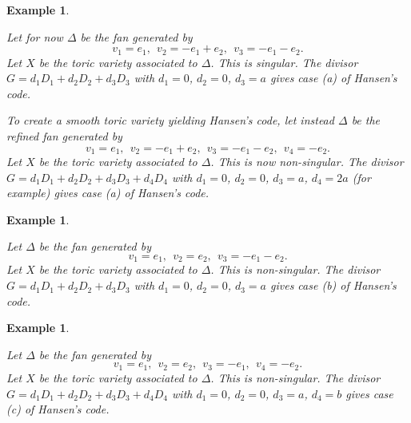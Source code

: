\documentclass[12pt]{article}
\newtheorem{example}[theorem]{Example}
\begin{document}
\begin{example}
\label{example:fan5}

Let for now $\Delta$ be the fan generated by 
\[
v_1=e_1,\ \ v_2=-e_1+e_2,\ \ v_3=-e_1-e_2.
\]
Let $X$ be the toric variety associated to $\Delta$.
This is singular.
The divisor $G=d_1D_1+d_2D_2+d_3D_3$ with
$d_1=0$, $d_2=0$, $d_3=a$ gives case (a) of
Hansen's code.

To create a smooth toric variety yielding Hansen's code,
let instead $\Delta$ be the refined fan generated by 
\[
v_1=e_1,\ \ v_2=-e_1+e_2,\ \ v_3=-e_1-e_2,\ \ v_4=-e_2.
\]
Let $X$ be the toric variety associated to $\Delta$.
This is now non-singular.
The divisor $G=d_1D_1+d_2D_2+d_3D_3+d_4D_4$ with
$d_1=0$, $d_2=0$, $d_3=a$, $d_4=2a$ (for example)
gives case (a) of Hansen's code.
\end{example}


\begin{example}
\label{example:fan4}

Let $\Delta$ be the fan generated by 
\[
v_1=e_1,\ \ v_2=e_2,\ \ v_3=-e_1-e_2.
\]
Let $X$ be the toric variety associated to $\Delta$.
This is non-singular.
The divisor $G=d_1D_1+d_2D_2+d_3D_3$ with
$d_1=0$, $d_2=0$, $d_3=a$ gives case (b) of
Hansen's code.
\end{example}

\begin{example}
\label{example:fan3}

Let $\Delta$ be the fan generated by 
\[
v_1=e_1,\ \ v_2=e_2,\ \ v_3=-e_1,\ \ v_4=-e_2.
\]
Let $X$ be the toric variety associated to $\Delta$.
This is non-singular.
The divisor $G=d_1D_1+d_2D_2+d_3D_3+d_4D_4$ with
$d_1=0$, $d_2=0$, $d_3=a$, $d_4=b$ gives case (c) of
Hansen's code.

\end{example}
\end{document}

